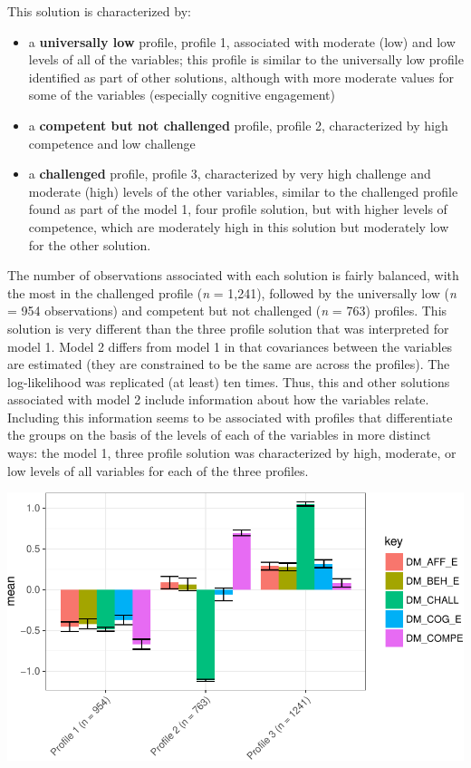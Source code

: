 \documentclass[]{book}
\providecommand{\tightlist}{%
  \setlength{\itemsep}{0pt}\setlength{\parskip}{0pt}}
\theoremstyle{definition}
\theoremstyle{definition}
\theoremstyle{definition}
\theoremstyle{remark}
\begin{document}
This solution is characterized by:

\begin{itemize}
\tightlist
\item
  a \textbf{universally low} profile, profile 1, associated with
  moderate (low) and low levels of all of the variables; this profile is
  similar to the universally low profile identified as part of other
  solutions, although with more moderate values for some of the
  variables (especially cognitive engagement)
\item
  a \textbf{competent but not challenged} profile, profile 2,
  characterized by high competence and low challenge
\item
  a \textbf{challenged} profile, profile 3, characterized by very high
  challenge and moderate (high) levels of the other variables, similar
  to the challenged profile found as part of the model 1, four profile
  solution, but with higher levels of competence, which are moderately
  high in this solution but moderately low for the other solution.
\end{itemize}

The number of observations associated with each solution is fairly
balanced, with the most in the challenged profile (\emph{n} = 1,241),
followed by the universally low (\emph{n} = 954 observations) and
competent but not challenged (\emph{n} = 763) profiles. This solution is
very different than the three profile solution that was interpreted for
model 1. Model 2 differs from model 1 in that covariances between the
variables are estimated (they are constrained to be the same are across
the profiles). The log-likelihood was replicated (at least) ten times.
Thus, this and other solutions associated with model 2 include
information about how the variables relate. Including this information
seems to be associated with profiles that differentiate the groups on
the basis of the levels of each of the variables in more distinct ways:
the model 1, three profile solution was characterized by high, moderate,
or low levels of all variables for each of the three profiles.

\begin{center}\includegraphics[width=0.8\linewidth]{rosenberg-dissertation_files/figure-latex/m2_3p-1} \end{center}
\end{document}
